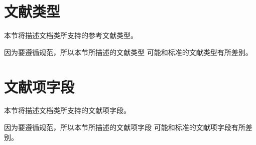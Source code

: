 \section{文献类型}\label{sec:bib-type}

本节将描述{\njuthesis}文档类所支持的参考文献类型。

\begin{note}
因为要遵循规范\cite{gbt7714-2005}，所以本节所描述的文献类型
可能和标准{\BibTeX}的文献类型有所差别。
\end{note}






















\section{文献项字段}\label{sec:bib-field}

本节将描述{\njuthesis}文档类所支持的文献项字段。

\begin{note}
因为要遵循规范\cite{gbt7714-2005}，所以本节所描述的文献项字段
可能和标准{\BibTeX}的文献项字段有所差别。
\end{note}
























